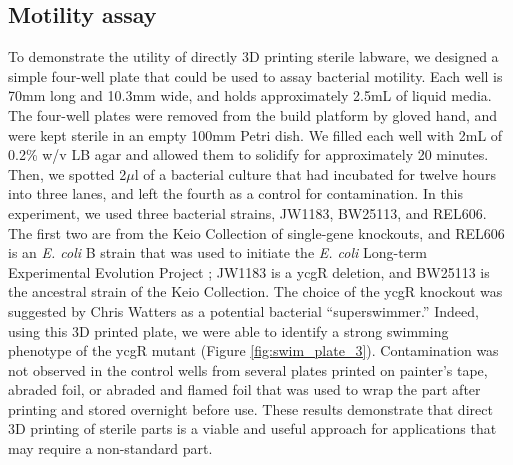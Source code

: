 \documentclass[fleqn,10pt]{wlpeerj}
\begin{document}
\subsection{Motility assay}

To demonstrate the utility of directly 3D printing sterile labware, we designed a simple four-well plate that could be used to assay bacterial motility. \cite{swimplate} Each well is 70mm long and 10.3mm wide, and holds approximately 2.5mL of liquid media. The four-well plates were removed from the build platform by gloved hand, and were kept sterile in an empty 100mm Petri dish. We filled each well with 2mL of 0.2\% w/v LB agar and allowed them to solidify for approximately 20 minutes. Then, we spotted 2$\mu$l of a bacterial culture that had incubated for twelve hours into three lanes, and left the fourth as a control for contamination. In this experiment, we used three bacterial strains, JW1183, BW25113, and REL606. The first two are from the Keio Collection of single-gene knockouts, and REL606 is an {\em E. coli} B strain that was used to initiate the {\em E. coli} Long-term Experimental Evolution Project \cite{lenski1991}; JW1183 is a ycgR deletion, and BW25113 is the ancestral strain of the Keio Collection. \cite{keio} The choice of the ycgR knockout was suggested by Chris Watters as a potential bacterial ``superswimmer.'' \cite{WatersLabMSU2014} Indeed, using this 3D printed plate, we were able to identify a strong swimming phenotype of the ycgR mutant (Figure \ref{fig:swim_plate_3}). Contamination was not observed in the control wells from several plates printed on painter's tape, abraded foil, or abraded and flamed foil that was used to wrap the part after printing and stored overnight before use. These results demonstrate that direct 3D printing of sterile parts is a viable and useful approach for applications that may require a non-standard part.
\end{document}
